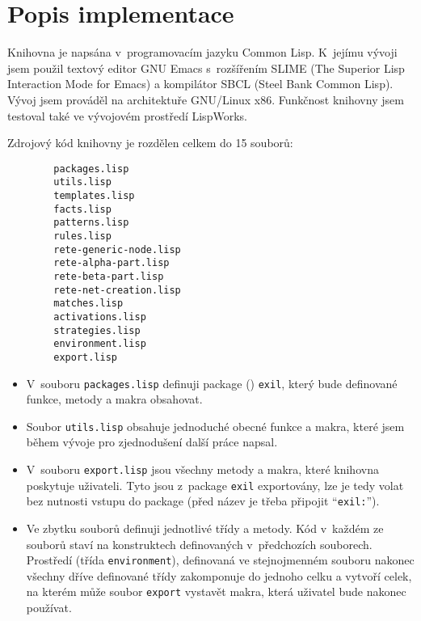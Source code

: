 \section{Popis implementace}
Knihovna je napsána v~programovacím jazyku Common Lisp. K~jejímu vývoji jsem
použil textový editor \textsf{GNU Emacs} s~rozšířením \textsf{SLIME} (The
Superior Lisp Interaction Mode for Emacs) a kompilátor \textsf{SBCL} (Steel Bank
Common Lisp). Vývoj jsem prováděl na architektuře \textsf{GNU/Linux x86}.
Funkčnost knihovny jsem testoval také ve vývojovém prostředí
LispWorks\textsuperscript{\textregistered}.

Zdrojový kód knihovny je rozdělen celkem do 15 souborů:
\begin{verbatim}
        packages.lisp
        utils.lisp
        templates.lisp
        facts.lisp
        patterns.lisp
        rules.lisp
        rete-generic-node.lisp
        rete-alpha-part.lisp
        rete-beta-part.lisp
        rete-net-creation.lisp
        matches.lisp
        activations.lisp
        strategies.lisp
        environment.lisp
        export.lisp
\end{verbatim}
\begin{itemize}
\item V~souboru \verb|packages.lisp| definuji package () \verb|exil|,
který bude definované funkce, metody a makra obsahovat.
\item Soubor \verb|utils.lisp| obsahuje jednoduché obecné funkce a makra, které
jsem během vývoje pro zjednodušení další práce napsal.
\item V~souboru \verb|export.lisp| jsou všechny metody a makra, které knihovna
poskytuje uživateli. Tyto jsou z~package \verb|exil| exportovány, lze je
tedy volat bez nutnosti vstupu do package (před název je třeba připojit
``\verb|exil:|'').
\item Ve zbytku souborů definuji jednotlivé třídy a metody. Kód v~každém ze
souborů staví na konstruktech definovaných v~předchozích souborech. Prostředí
(třída \verb|environment|), definovaná ve stejnojmenném souboru nakonec všechny
dříve definované třídy zakomponuje do jednoho celku a vytvoří celek, na kterém
může soubor \verb|export| vystavět makra, která uživatel bude nakonec používat.
\end{itemize}
